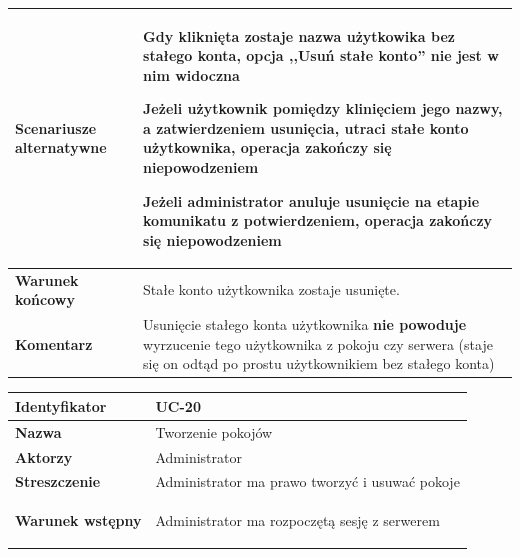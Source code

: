 {\begin{tabular}{ | l | l | }
	\hline
		\parbox[t]{4cm}{\textbf{Scenariusze alternatywne}} & \parbox[t]
		{11cm}{
			\begin{enumreq}
				\item Gdy kliknięta zostaje nazwa użytkowika bez stałego
				konta, opcja ,,Usuń stałe konto'' nie jest w nim widoczna
				\item Jeżeli użytkownik pomiędzy klinięciem jego nazwy,
				a zatwierdzeniem usunięcia, utraci stałe konto użytkownika,
				operacja zakończy się niepowodzeniem
				\item Jeżeli administrator anuluje usunięcie na etapie
				komunikatu z potwierdzeniem, operacja zakończy się
				niepowodzeniem 
			\end{enumreq}
		}
		\\
		
	\hline
		\parbox[t]{4cm}{\textbf{Warunek końcowy}} & \parbox[t]{11cm}{
			Stałe konto użytkownika zostaje usunięte.
		}
		\\
		
	\hline
		\parbox[t]{4cm}{\textbf{Komentarz}} & \parbox[t]{11cm}{
			Usunięcie stałego konta użytkownika \textbf{nie powoduje}
			wyrzucenie tego użytkownika z pokoju czy serwera (staje
			się on odtąd po prostu użytkownikiem bez stałego konta)
		}
		\\

	\hline
\end{tabular}

\vspace{2em}

\begin{tabular}{ | l | l | }
	\hline
		\textbf{Identyfikator} & 
		UC-20
		\\
		
	\hline
		\textbf{Nazwa} & 
		Tworzenie pokojów
		\\
		
	\hline
		\textbf{Aktorzy} & \parbox[t]{11cm}{
			Administrator
		}\\
		 
	\hline
		\parbox[t]{4cm}{\textbf{Streszczenie}} & \parbox[t]{11cm}{
			Administrator ma prawo tworzyć i usuwać pokoje 
			
		}\\
		
	\hline
		\parbox[t]{4cm}{\textbf{Warunek wstępny}} & \parbox[t]{11cm}{
			\begin{enumreq}
				\item Administrator ma rozpoczętą sesję z serwerem
			\end{enumreq}
				
}
\end{tabular}}

